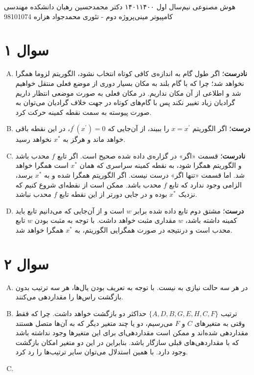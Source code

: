 \documentclass[a4paper, 12pt]{article}
\begin{document}
\handout
{هوش مصنوعی}
{نیم‌سال اول
۱۴۰۱\lr{-}۱۴۰۰}
{دکتر محمدحسین رهبان}
{دانشکده مهندسی کامپیوتر}
{مینی‌پروژه دوم - تئوری}
{محمدجواد هزاره}
{98101074}
\noindent
\\[-6em]
\section*{سوال ۱}
\begin{enumerate}[A)]
	\item \textbf{نادرست}؛
	اگر طول گام به اندازه‌ی کافی کوتاه انتخاب نشود، الگوریتم لزوما همگرا نخواهد شد؛ چرا که با گام بلند به مکان بسیار دوری از موضع فعلی منتقل خواهیم شد و اطلاعی از آن مکان نداریم. در مکان فعلی به صورت موضعی انتظار داریم گرادیان زیاد تغییر نکند پس با گام‌های کوتاه در جهت خلاف گرادیان می‌توان به صورت پیوسته به سمت نقطه کمینه حرکت کرد.
	\item \textbf{درست}؛
	اگر الگوریتم $x = x^\prime$ را ببیند، از آن‌جایی که
	$f^\prime(x^\prime) = 0$،
	در این نقطه باقی خواهد ماند و هرگز به 
	$x^\ast$
	نخواهد رسید.
	\item \textbf{نادرست}؛
	قسمت «اگر» در گزاره‌ی داده شده صحیح است. اگر تابع $f$ محدب باشد و الگوریتم همگرا شود، به نقطه کمینه سراسری که همان $x^\ast$ است همگرا خواهد شد. اما قسمت «تنها اگر» درست نیست. اگر الگوریتم همگرا شده و به $x^\ast$ برسد، الزامی وجود ندارد که تابع $f$ محدب باشد. ممکن است از نقطه‌ای شروع کنیم که نزدیک $x^\ast$ بوده و در جایی دورتر از این نقطه تابع $f$ محدب نباشد.
	\item \textbf{درست}؛
	مشتق دوم تابع داده شده برابر $w$ است و از آن‌جایی که می‌دانیم تابع باید کمینه داشته باشد، $w$ مقداری مثبت خواهد داشت. با توجه به مثبت بودن $w$ تابع محدب است و درنتیجه در صورت همگرایی الگوریتم، به $x^\ast$ همگرا خواهد شد.
\end{enumerate}
\section*{سوال ۲}
\begin{enumerate}[A)]
	\item
	در هر سه حالت نیازی به  نیست. با توجه به تعریف  بودن یال‌ها، هر سه ترتیب بدون بازگشت راس‌ها را مقداردهی می‌کنند.
	\item
	ترتیب
	$\{A,D,B,G,E,H,C,F\}$
	حداکثر دو بازگشت خواهد داشت. چرا که فقط وقتی به متغیر‌های $C$ و $F$ می‌رسیم، دو یا چند متغیر دیگر که به آن‌ها متصل هستند مقداردهی شده‌اند و ممکن است مقداردهی‌ای برای این متغیرها وجود نداشته باشد که با مقداردهی‌های قبلی سازگار باشد. بنابراین در این دو متغیر امکان بازگشت وجود دارد. با همین استدلال می‌توان سایر ترتیب‌ها را رد کرد.
	\item
\end{enumerate}
\end{document}
